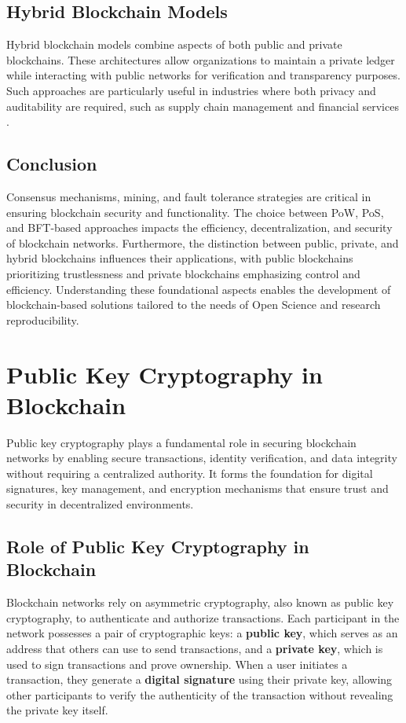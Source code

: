 \documentclass{article}
\begin{document}
\subsection{Hybrid Blockchain Models}
Hybrid blockchain models combine aspects of both public and private blockchains. These architectures allow organizations to maintain a private ledger while interacting with public networks for verification and transparency purposes. Such approaches are particularly useful in industries where both privacy and auditability are required, such as supply chain management and financial services \cite{zhao2019blockchain}.

\subsection{Conclusion}
Consensus mechanisms, mining, and fault tolerance strategies are critical in ensuring blockchain security and functionality. The choice between PoW, PoS, and BFT-based approaches impacts the efficiency, decentralization, and security of blockchain networks. Furthermore, the distinction between public, private, and hybrid blockchains influences their applications, with public blockchains prioritizing trustlessness and private blockchains emphasizing control and efficiency. Understanding these foundational aspects enables the development of blockchain-based solutions tailored to the needs of Open Science and research reproducibility.


\section*{Public Key Cryptography in Blockchain}

Public key cryptography plays a fundamental role in securing blockchain networks by enabling secure transactions, identity verification, and data integrity without requiring a centralized authority. It forms the foundation for digital signatures, key management, and encryption mechanisms that ensure trust and security in decentralized environments.

\subsection*{Role of Public Key Cryptography in Blockchain}
Blockchain networks rely on asymmetric cryptography, also known as public key cryptography, to authenticate and authorize transactions. Each participant in the network possesses a pair of cryptographic keys: a \textbf{public key}, which serves as an address that others can use to send transactions, and a \textbf{private key}, which is used to sign transactions and prove ownership. When a user initiates a transaction, they generate a \textbf{digital signature} using their private key, allowing other participants to verify the authenticity of the transaction without revealing the private key itself.
\end{document}
